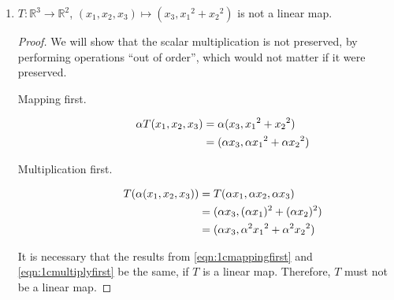 \documentclass{article}
\renewcommand{\a}{\alpha}
\newcommand{\R}{\mathbb{R}}
\begin{document}
\begin{enumerate}
\begin{enumerate}
            \item $T : \R^3 \to \R^2$, $(x_1, x_2, x_3) \mapsto (x_3, {x_1}^2 + {x_2}^2)$ is not a linear map.
                \begin{proof}
                    We will show that the scalar multiplication is not
                    preserved, by performing operations ``out of order'', which
                    would not matter if it were preserved.
                    \begin{description}
                        \item[Mapping first.]
                            \begin{align}
                                \a T(x_1, x_2, x_3) &= \a (x_3, {x_1}^2 + {x_2}^2) \notag \\
                                                    &= (\a x_3, \a {x_1}^2 + \a {x_2}^2)
                                \label{eqn:1cmappingfirst}
                            \end{align}

                        \item[Multiplication first.]
                            \begin{align}
                                T(\a (x_1, x_2, x_3)) &= T(\a x_1, \a x_2, \a x_3) \notag \\
                                                      &= (\a x_3, (\a x_1)^2 + (\a x_2)^2) \notag \\
                                                      &= (\a x_3, \a^2 {x_1}^2 + \a^2 {x_2}^2)
                                \label{eqn:1cmultiplyfirst}
                            \end{align}
                    \end{description}

                    It is necessary that the results from
                    \eqref{eqn:1cmappingfirst} and \eqref{eqn:1cmultiplyfirst} be
                    the same, if $T$ is a linear map. Therefore, $T$ must not
                    be a linear map.
                \end{proof}


\end{enumerate}
\end{enumerate}
\end{document}
